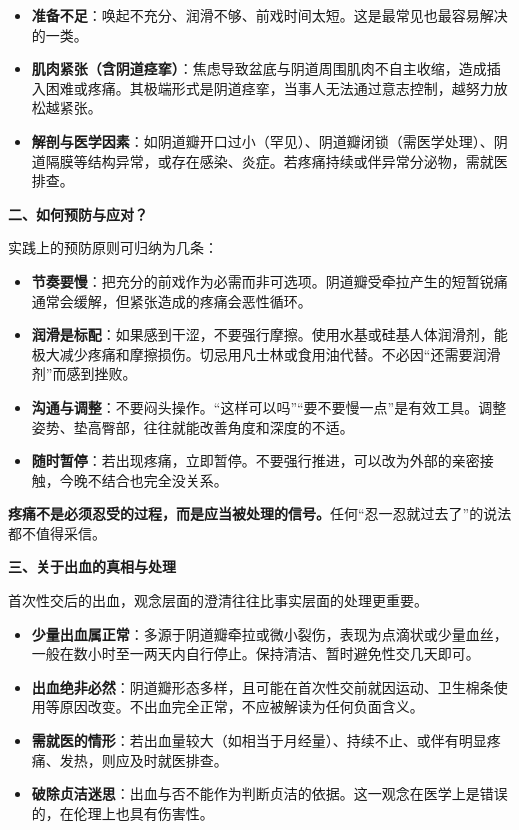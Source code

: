 \documentclass[12pt,UTF8]{ctexbook}
\begin{document}
\begin{itemize}
\item \textbf{准备不足}：唤起不充分、润滑不够、前戏时间太短。这是最常见也最容易解决的一类。
\item \textbf{肌肉紧张（含阴道痉挛）}：焦虑导致盆底与阴道周围肌肉不自主收缩，造成插入困难或疼痛。其极端形式是阴道痉挛，当事人无法通过意志控制，越努力放松越紧张。
\item \textbf{解剖与医学因素}：如阴道瓣开口过小（罕见）、阴道瓣闭锁（需医学处理）、阴道隔膜等结构异常，或存在感染、炎症。若疼痛持续或伴异常分泌物，需就医排查。
\end{itemize}

\textbf{二、如何预防与应对？}

实践上的预防原则可归纳为几条：

\begin{itemize}
\item \textbf{节奏要慢}：把充分的前戏作为必需而非可选项。阴道瓣受牵拉产生的短暂锐痛通常会缓解，但紧张造成的疼痛会恶性循环。
\item \textbf{润滑是标配}：如果感到干涩，不要强行摩擦。使用水基或硅基人体润滑剂，能极大减少疼痛和摩擦损伤。切忌用凡士林或食用油代替。不必因“还需要润滑剂”而感到挫败。
\item \textbf{沟通与调整}：不要闷头操作。“这样可以吗”“要不要慢一点”是有效工具。调整姿势、垫高臀部，往往就能改善角度和深度的不适。
\item \textbf{随时暂停}：若出现疼痛，立即暂停。不要强行推进，可以改为外部的亲密接触，今晚不结合也完全没关系。
\end{itemize}

\textbf{疼痛不是必须忍受的过程，而是应当被处理的信号。}任何“忍一忍就过去了”的说法都不值得采信。

\textbf{三、关于出血的真相与处理}

首次性交后的出血，观念层面的澄清往往比事实层面的处理更重要。

\begin{itemize}
\item \textbf{少量出血属正常}：多源于阴道瓣牵拉或微小裂伤，表现为点滴状或少量血丝，一般在数小时至一两天内自行停止。保持清洁、暂时避免性交几天即可。
\item \textbf{出血绝非必然}：阴道瓣形态多样，且可能在首次性交前就因运动、卫生棉条使用等原因改变。不出血完全正常，不应被解读为任何负面含义。
\item \textbf{需就医的情形}：若出血量较大（如相当于月经量）、持续不止、或伴有明显疼痛、发热，则应及时就医排查。
\item \textbf{破除贞洁迷思}：出血与否不能作为判断贞洁的依据。这一观念在医学上是错误的，在伦理上也具有伤害性。
\end{itemize}
\end{document}
